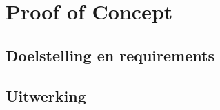 \chapter{Proof of Concept}%
\label{ch:proofofconcept}

\section{Doelstelling en requirements}

\section{Uitwerking}